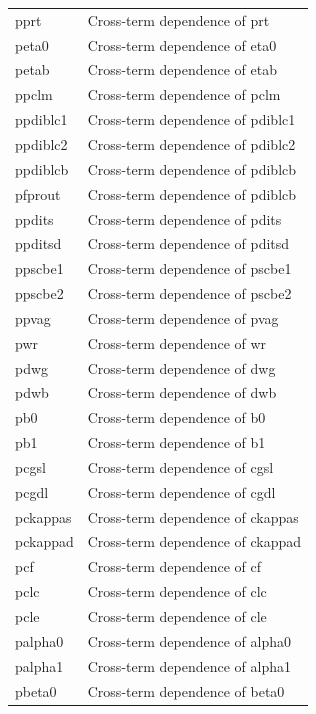 \begin{longtable}{l l}
{\small pprt} & {\small Cross-term dependence of prt } \\
{\small peta0} & {\small Cross-term dependence of eta0} \\
{\small petab} & {\small Cross-term dependence of etab} \\
{\small ppclm} & {\small Cross-term dependence of pclm} \\
{\small ppdiblc1} & {\small Cross-term dependence of pdiblc1} \\
{\small ppdiblc2} & {\small Cross-term dependence of pdiblc2} \\
{\small ppdiblcb} & {\small Cross-term dependence of pdiblcb} \\
{\small pfprout} & {\small Cross-term dependence of pdiblcb} \\
{\small ppdits} & {\small Cross-term dependence of pdits} \\
{\small ppditsd} & {\small Cross-term dependence of pditsd} \\
{\small ppscbe1} & {\small Cross-term dependence of pscbe1} \\
{\small ppscbe2} & {\small Cross-term dependence of pscbe2} \\
{\small ppvag} & {\small Cross-term dependence of pvag} \\   
{\small pwr} & {\small Cross-term dependence of wr} \\
{\small pdwg} & {\small Cross-term dependence of dwg} \\
{\small pdwb} & {\small Cross-term dependence of dwb} \\
{\small pb0} & {\small Cross-term dependence of b0} \\
{\small pb1} & {\small Cross-term dependence of b1} \\
{\small pcgsl} & {\small Cross-term dependence of cgsl} \\
{\small pcgdl} & {\small Cross-term dependence of cgdl} \\
{\small pckappas} & {\small Cross-term dependence of ckappas} \\
{\small pckappad} & {\small Cross-term dependence of ckappad} \\
{\small pcf} & {\small Cross-term dependence of cf} \\
{\small pclc} & {\small Cross-term dependence of clc} \\
{\small pcle} & {\small Cross-term dependence of cle} \\
{\small palpha0} & {\small Cross-term dependence of alpha0} \\
{\small palpha1} & {\small Cross-term dependence of alpha1} \\
{\small pbeta0} & {\small Cross-term dependence of beta0} \\


\end{longtable}
